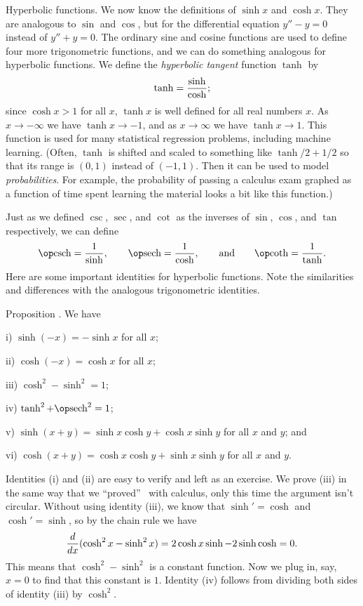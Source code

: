 \medskip\boldlabel Hyperbolic functions.
We now know the definitions of $\sinh x$ and $\cosh x$. They are analogous to $\sin$ and $\cos$, but
for the differential equation $y''-y=0$ instead of $y''+y=0$. The ordinary sine and cosine functions
are used to define four more trigonometric functions, and we can do something analogous for hyperbolic functions.
We define the {\it hyperbolic tangent} function $\tanh$ by
$$\tanh = {\sinh \over \cosh };$$
since $\cosh x > 1$ for all $x$, $\tanh x$ is well defined for all real numbers $x$. As $x\to-\infty$
we have $\tanh x \to -1$, and as $x\to \infty$ we have $\tanh x \to 1$. This function is used for many
statistical regression problems, including machine learning. (Often, $\tanh$ is shifted and scaled
to something like $\tanh/2 +1/2$ so that its range is $(0,1)$ instead of $(-1,1)$. Then it can be used
to model {\it probabilities}. For example, the probability of passing a calculus exam graphed as a function
of time spent learning the material looks a bit like this function.)

Just as we defined $\csc$, $\sec$, and $\cot$ as the inverses of $\sin$, $\cos$, and $\tan$ respectively,
we can define
$$\csch = {1\over \sinh},\qquad \sech = {1\over \cosh}, \qquad\hbox{and}\qquad \coth = {1\over \tanh}.$$
Here are some important identities for hyperbolic functions. Note the similarities and differences with
the analogous trigonometric identities.

\edef\prophyperbolicrules{\the\thmcount}
\proclaim Proposition \advthm. We have
\medskip
\item{i)} $\sinh(-x) = -\sinh x$ for all $x$;
\smallskip
\item{ii)} $\cosh(-x) = \cosh x$ for all $x$;
\smallskip
\item{iii)} $\cosh^2 - \sinh^2 = 1$;
\smallskip
\item{iv)} $\tanh^2 + \sech^2 = 1$;
\smallskip
\item{v)} $\sinh(x+y) = \sinh x \cosh y + \cosh x \sinh y$ for all $x$ and $y$; and
\smallskip
\item{vi)} $\cosh(x+y) = \cosh x\cosh y + \sinh x \sinh y$ for all $x$ and $y$.
\smallskip

\proof Identities (i) and (ii) are easy to verify and left as an exercise. We prove (iii) in the same way
that we ``proved''~ with calculus, only this time the argument isn't circular.
Without using identity (iii), we know that $\sinh' = \cosh$ and $\cosh' = \sinh$, so by the chain rule
we have
$${d\over dx} (\cosh^2 x - \sinh^2 x) = 2\cosh x\sinh - 2\sinh \cosh = 0.$$
This means that $\cosh^2 - \sinh^2$ is a constant function. Now we plug in, say, $x=0$ to find that this
constant is $1$.
Identity (iv) follows from dividing both sides of identity (iii) by $\cosh^2$.

